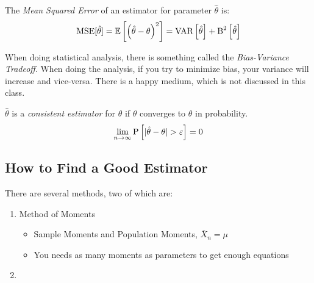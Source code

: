 			\begin{definition} \label{def:Mean Squared Error}
				The \emph{Mean Squared Error} of an estimator for parameter $\hat{\theta}$ is:
				\begin{equation} \label{eq:Mean Squared Error}
					\operatorname{\text{MSE}} [ \hat{\theta} ]
					= \operatorname{\mathbb{E}} \left[ \left( \hat{\theta} - \theta \right)^{2} \right]
					= \operatorname{\text{VAR}} \left[ \hat{\theta} \right] + \operatorname{B}^{2} \left[ \hat{\theta} \right]
				\end{equation}
			\end{definition}
			\begin{remark*}
				When doing statistical analysis, there is something called the \emph{Bias-Variance Tradeoff}.
				When doing the analysis, if you try to minimize bias, your variance will increase and vice-versa.
				There is a happy medium, which is not discussed in this class.
			\end{remark*}
			\begin{definition}[Consistency] \label{def:Consistency}
				$\hat{\theta}$ is a \emph{consistent estimator} for $\theta$ if $\hat{\theta}$ converges to $\theta$ in probability.
				\begin{equation} \label{eq:Consistency}
					\lim\limits_{n \rightarrow \infty} \operatorname{P} \left[ \lvert \hat{\theta} - \theta \rvert > \varepsilon \right] = 0
				\end{equation}
			\end{definition}
	
	\subsection{How to Find a Good Estimator} \label{subsec:Find Good Estimator}
	There are several methods, two of which are:
		\begin{enumerate}
			\item Method of Moments
				\begin{itemize}[noitemsep, nolistsep]
					\item Sample Moments and Population Moments, $\bar{X}_{n} = \mu$
					\item You needs as many moments as parameters to get enough equations
				\end{itemize}
			\item {}
		\end{enumerate}
	
